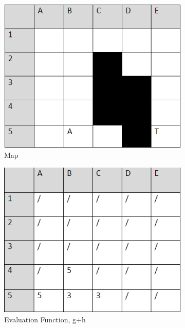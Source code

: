 \documentclass[paper=a4, fontsize=11pt]{scrartcl} %
\begin{document}
\begin{figure}[h]
	\centering
	\begin{subfigure}[b]{0.4\linewidth}
		\includegraphics[width=\linewidth]{table1}
		\caption{Map}
	  \end{subfigure}
	\begin{subfigure}[b]{0.4\linewidth}
	\centering
	\includegraphics[width=\linewidth]{table2}
	\caption{Evaluation Function, g+h}
	\end{subfigure}
	\begin{subfigure}[b]{0.4\linewidth}
	\centering

\end{subfigure}
\end{figure}
\end{document}
